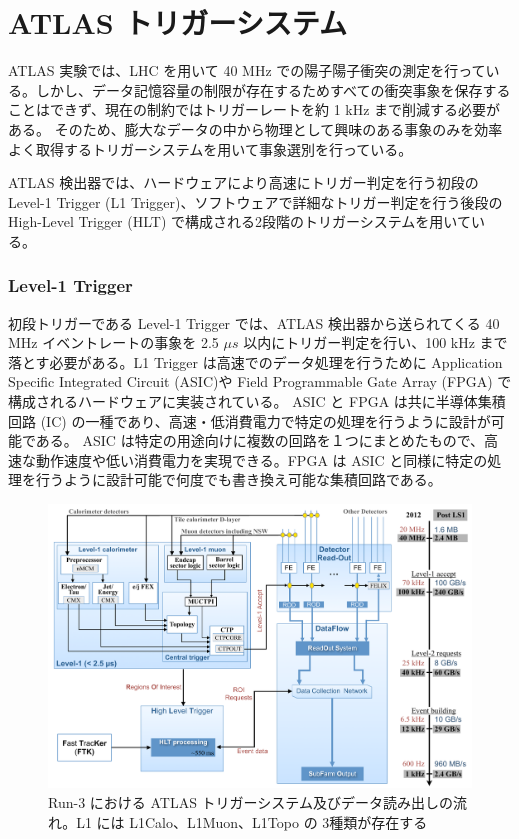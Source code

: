 \section{ATLAS トリガーシステム}
ATLAS 実験では、LHC を用いて 40 MHz での陽子陽子衝突の測定を行っている。しかし、データ記憶容量の制限が存在するためすべての衝突事象を保存することはできず、現在の制約ではトリガーレートを約 1 kHz まで削減する必要がある。
そのため、膨大なデータの中から物理として興味のある事象のみを効率よく取得するトリガーシステムを用いて事象選別を行っている。

ATLAS 検出器では、ハードウェアにより高速にトリガー判定を行う初段の Level-1 Trigger (L1 Trigger)、ソフトウェアで詳細なトリガー判定を行う後段の High-Level Trigger (HLT) で構成される2段階のトリガーシステムを用いている。

\subsubsection{Level-1 Trigger}
初段トリガーである Level-1 Trigger では、ATLAS 検出器から送られてくる 40 MHz イベントレートの事象を 2.5 $\mu s$ 以内にトリガー判定を行い、100 kHz まで落とす必要がある。L1 Trigger は高速でのデータ処理を行うために Application Specific Integrated Circuit (ASIC)や Field Programmable Gate Array (FPGA) で構成されるハードウェアに実装されている。
ASIC と FPGA は共に半導体集積回路 (IC) の一種であり、高速・低消費電力で特定の処理を行うように設計が可能である。
ASIC は特定の用途向けに複数の回路を１つにまとめたもので、高速な動作速度や低い消費電力を実現できる。FPGA は ASIC と同様に特定の処理を行うように設計可能で何度でも書き換え可能な集積回路である。

\begin{figure}[tb]
  \centering
  \includegraphics[clip, width=14cm]{fig/3/trigger-nagare2.pdf}
  \caption{Run-3 における ATLAS トリガーシステム及びデータ読み出しの流れ。L1 には L1Calo、L1Muon、L1Topo の 3種類が存在する}
  \label{fig:トリガーの全体像}
\end{figure}

